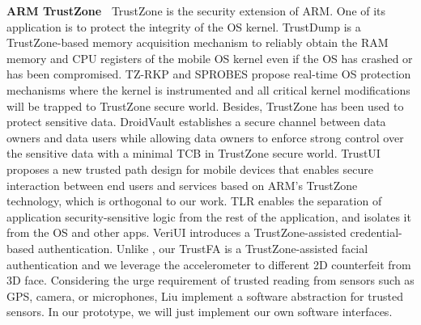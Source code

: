 \noindent
{\bf ARM TrustZone~}
TrustZone is the security extension of ARM. One of its application is to
protect the integrity of the OS kernel. TrustDump \cite{TrustDump} is a
TrustZone-based memory acquisition mechanism to reliably obtain the RAM memory
and CPU registers of the mobile OS kernel even if the OS has crashed or has
been compromised.  TZ-RKP \cite{TZ-RKP} and SPROBES \cite{SPROBES} propose
real-time OS protection mechanisms where the kernel is instrumented and all
critical kernel modifications will be trapped to TrustZone secure world.
Besides, TrustZone has been used to protect sensitive data.  DroidVault
\cite{DroidVault} establishes a secure channel between data owners and data
users while allowing data owners to enforce strong control over the sensitive
data with a minimal TCB in TrustZone secure world. TrustUI \cite{TrustUI}
proposes a new trusted path design for mobile devices that enables secure
interaction between end users and services based on ARM's TrustZone technology,
which is orthogonal to our work.  TLR \cite{TLR} enables the separation of
application security-sensitive logic from the rest of the application, and
isolates it from the OS and other apps. VeriUI \cite{VeriUI} introduces a TrustZone-assisted
credential-based authentication.  Unlike \cite{TrustUI}, our TrustFA is a
TrustZone-assisted facial authentication and we leverage the accelerometer to
different 2D counterfeit from 3D face.  Considering the urge requirement of
trusted reading from sensors such as GPS, camera, or microphones, Liu \etal
\cite{TrustSensor} implement a software abstraction for trusted sensors. In
our prototype, we will just implement our own software interfaces.
